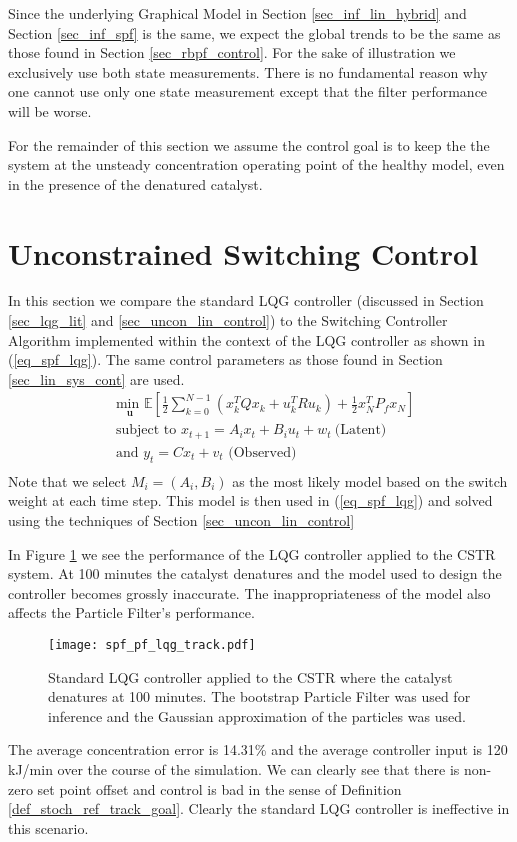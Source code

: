 Since the underlying Graphical Model in Section \ref{sec_inf_lin_hybrid} and Section \ref{sec_inf_spf} is the same, we expect the global trends to be the same as those found in Section \ref{sec_rbpf_control}. For the sake of illustration we exclusively use both state measurements. There is no fundamental reason why one cannot use only one state measurement except that the filter performance will be worse.

For the remainder of this section we assume the control goal is to keep the the system at the unsteady concentration operating point of the healthy model, even in the presence of the denatured catalyst.

\section{Unconstrained Switching Control}
\label{sec_spf_uncon}
In this section we compare the standard LQG controller (discussed in Section \ref{sec_lqg_lit} and \ref{sec_uncon_lin_control}) to the Switching Controller Algorithm implemented within the context of the LQG controller as shown in (\ref{eq_spf_lqg}). The same control parameters as those found in Section \ref{sec_lin_sys_cont} are used.
\begin{equation}
\begin{aligned}
&\underset{\mathbf{u}}{\text{min }} \mathbb{E}\left[ \frac{1}{2}\sum_{k=0}^{N-1} \left( x_k^TQx_k + u_k^TRu_k \right) + \frac{1}{2}x_N^TP_fx_N \right] \\
& \text{subject to } x_{t+1}=A_ix_t+B_iu_t + w_t~\text{(Latent)} \\
& \text{and } y_{t}= Cx_t + v_t \text{ (Observed)}\\
\end{aligned}
\label{eq_spf_lqg}
\end{equation}
Note that we select $M_i=(A_i, B_i)$ as the most likely model based on the switch weight at each time step. This model is then used in (\ref{eq_spf_lqg}) and solved using the techniques of Section \ref{sec_uncon_lin_control}
 
In Figure \ref{fig_spf_pf_lqg_track} we see the performance of the LQG controller applied to the CSTR system. At 100 minutes the catalyst denatures and the model used to design the controller becomes grossly inaccurate. The inappropriateness of the model also affects the Particle Filter's performance. 
\begin{figure}[H] 
\centering
\texttt{[image: spf\_pf\_lqg\_track.pdf]}
\caption{Standard LQG controller applied to the CSTR where the catalyst denatures at 100 minutes. The bootstrap Particle Filter was used for inference and the Gaussian approximation of the particles was used.}
\label{fig_spf_pf_lqg_track}
\end{figure}
The average concentration error is 14.31\% and the average controller input is 120 kJ/min over the course of the simulation. We can clearly see that there is non-zero set point offset and control is bad in the sense of Definition \ref{def_stoch_ref_track_goal}. Clearly the standard LQG controller is ineffective in this scenario.

